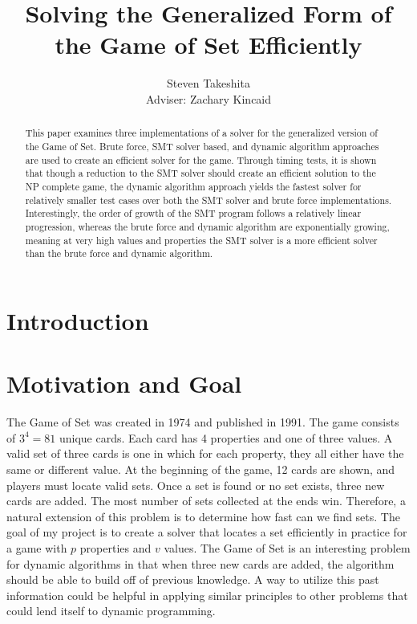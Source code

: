 \documentclass[pageno]{jpaper}
\begin{document}
\title{Solving the Generalized Form of the Game of Set Efficiently}

\author{Steven Takeshita\\Adviser: Zachary Kincaid}

\date{}
\maketitle

\thispagestyle{empty}
\doublespacing
\begin{abstract}
This paper examines three implementations of a solver for the generalized version of the Game of Set. Brute force, SMT solver based, and dynamic algorithm approaches are used to create an efficient solver for the game. Through timing tests, it is shown that though a reduction to the SMT solver should create an efficient solution to the NP complete game, the dynamic algorithm approach yields the fastest solver for relatively smaller test cases over both the SMT solver and brute force implementations. Interestingly, the order of growth of the SMT program follows a relatively linear progression, whereas the brute force and dynamic algorithm are exponentially growing, meaning at very high values and properties the SMT solver is a more efficient solver than the brute force and dynamic algorithm. 
\end{abstract}

\section{Introduction}



\section{Motivation and Goal}

The Game of Set was created in 1974 and published in 1991. The game consists of $3^4 = 81$ unique cards. Each card has 4 properties and one of three values. A valid set of three cards is one in which for each property, they all either have the same or different value. At the beginning of the game, 12 cards are shown, and players must locate valid sets. Once a set is found or no set exists, three new cards are added. The most number of sets collected at the ends win. Therefore, a natural extension of this problem is to determine how fast can we find sets. The goal of my project is to create a solver that locates a set efficiently in practice for a game with $p$ properties and $v$ values. The Game of Set is an interesting problem for dynamic algorithms in that when three new cards are added, the algorithm should be able to build off of previous knowledge. A way to utilize this past information could be helpful in applying similar principles to other problems that could lend itself to dynamic programming. 
\end{document}
